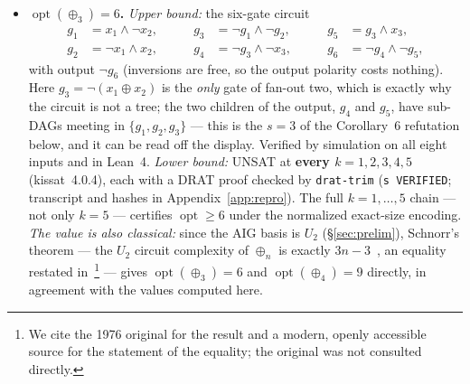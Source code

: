 \documentclass[11pt]{article}
\DeclareMathOperator{\opt}{opt}
\theoremstyle{plain}
\begin{document}
\begin{itemize}
  \item \textbf{$\opt(\oplus_3) = 6$.} \emph{Upper bound:} the six-gate circuit
  \begin{equation}\label{eq:c6}
  \begin{aligned}
    g_1 &= x_1 \wedge \neg x_2, &\qquad g_3 &= \neg g_1 \wedge \neg g_2, &\qquad g_5 &= g_3 \wedge x_3,\\
    g_2 &= \neg x_1 \wedge x_2, &\qquad g_4 &= \neg g_3 \wedge \neg x_3, &\qquad g_6 &= \neg g_4 \wedge \neg g_5,
  \end{aligned}
  \end{equation}
  with output $\neg g_6$ (inversions are free, so the output polarity costs nothing). Here
  $g_3 = \neg(x_1 \oplus x_2)$ is the \emph{only} gate of fan-out two, which is exactly why the
  circuit is not a tree; the two children of the output, $g_4$ and $g_5$, have sub-DAGs meeting in
  $\{g_1, g_2, g_3\}$ --- this is the $s = 3$ of the Corollary~6 refutation below, and it can be
  read off the display. Verified by simulation on all eight inputs and in Lean~4.
  \emph{Lower bound:}
  UNSAT at \textbf{every $k = 1,2,3,4,5$} (kissat~4.0.4), each with a DRAT proof checked by
  \texttt{drat-trim} (\texttt{s VERIFIED}; transcript and hashes in Appendix~\ref{app:repro}). The
  full $k = 1,\dots,5$ chain --- not only $k = 5$ --- certifies $\opt \ge 6$ under the normalized
  exact-size encoding. \emph{The value is also classical:} since the AIG basis is $U_2$ (\S\ref{sec:prelim}),
  Schnorr's theorem --- the $U_2$ circuit complexity of $\oplus_n$ is exactly
  $3n-3$~\cite{schnorr1976}, an equality restated in~\cite{morizumi2015}\footnote{We cite the
  1976 original for the result and a modern, openly accessible source for the statement of the
  equality; the original was not consulted directly.} --- gives $\opt(\oplus_3) = 6$ and $\opt(\oplus_4) = 9$ directly, in
  agreement with the values computed here.


\end{itemize}
\end{document}
